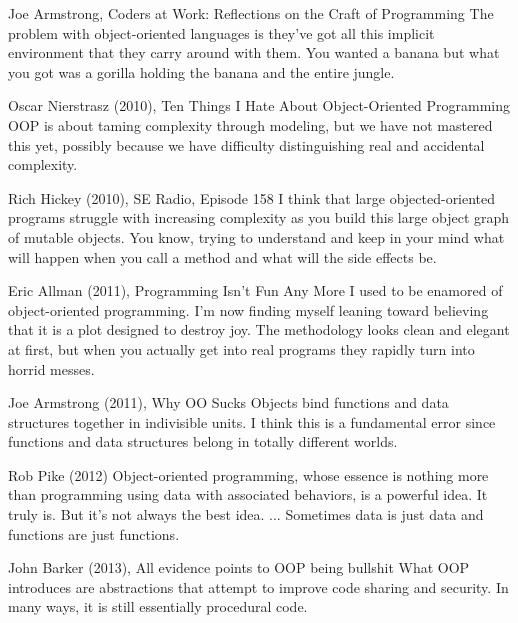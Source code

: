 \documentclass[12pt]{book}
\begin{document}
\begin{kodequote}{Joe Armstrong, Coders at Work: Reflections on the Craft of Programming}
	The problem with object-oriented languages is they've got all this implicit environment that they carry around with them. 
	You wanted a banana but what you got was a gorilla holding the banana and the entire jungle.
\end{kodequote}

\begin{kodequote}{Oscar Nierstrasz (2010), Ten Things I Hate About Object-Oriented Programming}
	OOP is about taming complexity through modeling, but we have not mastered this yet, possibly because we have difficulty distinguishing real and accidental complexity.
\end{kodequote}

\begin{kodequote}{Rich Hickey (2010), SE Radio, Episode 158}
	I think that large objected-oriented programs struggle with increasing complexity as you build this large object graph of mutable objects. You know, trying to understand and keep in your mind what will happen when you call a method and what will the side effects be.
\end{kodequote}

\begin{kodequote}{Eric Allman (2011), Programming Isn't Fun Any More}
	I used to be enamored of object-oriented programming. I'm now finding myself leaning toward believing that it is a plot designed to destroy joy. The methodology looks clean and elegant at first, but when you actually get into real programs they rapidly turn into horrid messes.
\end{kodequote}

\begin{kodequote}{Joe Armstrong (2011), Why OO Sucks}
	Objects bind functions and data structures together in indivisible units. I think this is a fundamental error since functions and data structures belong in totally different worlds.
\end{kodequote}

\begin{kodequote}{Rob Pike (2012)}
	Object-oriented programming, whose essence is nothing more than programming using data with associated behaviors, is a powerful idea. It truly is. But it's not always the best idea. ... Sometimes data is just data and functions are just functions.
\end{kodequote}

\begin{kodequote}{John Barker (2013), All evidence points to OOP being bullshit}
	What OOP introduces are abstractions that attempt to improve code sharing and security. In many ways, it is still essentially procedural code.
\end{kodequote}
\end{document}
